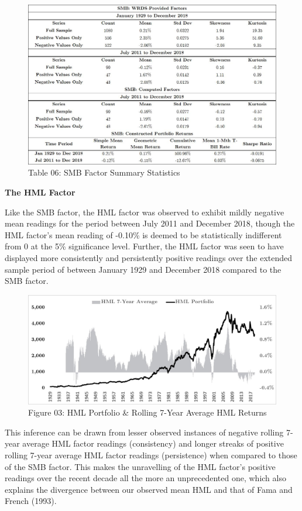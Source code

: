 \documentclass[12pt]{article}
\begin{document}
\begin{figure}[h]
	\centering
	\includegraphics[width=0.9\linewidth,trim=4 4 4 4,clip]{SMB03}
	\caption*{Table 06: SMB Factor Summary Statistics}
	\label{fig:label}
\end{figure}

\noindent \textbf{The HML Factor}

\noindent Like the SMB factor, the HML factor was observed to exhibit mildly negative mean readings for the period between July 2011 and December 2018, though the HML factor's mean reading of -0.10\% is deemed to be statistically indifferent from 0 at the 5\% significance level. Further, the HML factor was seen to have displayed more consistently and persistently positive readings over the extended sample period of between January 1929 and December 2018 compared to the SMB factor. \\

\begin{figure}[h]
	\centering
	\includegraphics[width=0.83\linewidth,trim=4 4 4 4,clip]{HML01}
	\caption*{Figure 03: HML Portfolio \& Rolling 7-Year Average HML Returns}
	\label{fig:label}
\end{figure}

\newpage

\noindent This inference can be drawn from lesser observed instances of negative rolling 7-year average HML factor readings (consistency) and longer streaks of positive rolling 7-year average HML factor readings (persistence) when compared to those of the SMB factor. This makes the unravelling of the HML factor's positive readings over the recent decade all the more an unprecedented one, which also explains the divergence between our observed mean HML and that of Fama and French (1993). 
\end{document}
